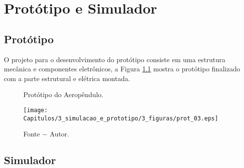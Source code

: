 \chapter{Protótipo e Simulador}

\section{Protótipo}

O projeto para o desenvolvimento do protótipo consiste em uma estrutura mecânica e componentes eletrônicos, a Figura \ref{fig3:image_01} mostra o protótipo finalizado com a parte estrutural e elétrica montada.

\begin{figure}[!h]
	\centering
	\caption{Protótipo do Aeropêndulo.}
	\texttt{[image: Capitulos/3\_simulacao\_e\_prototipo/3\_figuras/prot\_03.eps]}
	\caption*{Fonte $-$ Autor.}
	\label{fig3:image_01}
\end{figure}







\section{ Simulador}

